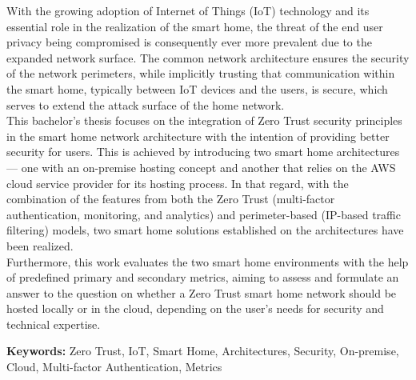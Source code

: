 With the growing adoption of Internet of Things (IoT) technology and its essential role in the realization of the smart home, the threat of the end user privacy being compromised is consequently ever more prevalent due to the expanded network surface. The common network architecture ensures the security of the network perimeters, while implicitly trusting that communication within the smart home, typically between IoT devices and the users, is secure, which serves to extend the attack surface of the home network.\\
This bachelor's thesis focuses on the integration of Zero Trust security principles in the smart home network architecture with the intention of providing better security for users. This is achieved by introducing two smart home architectures — one with an on-premise hosting concept and another that relies on the AWS cloud service provider for its hosting process. In that regard, with the combination of the features from both the Zero Trust (multi-factor authentication, monitoring, and analytics) and perimeter-based (IP-based traffic filtering) models, two smart home solutions established on the architectures have been realized.\\
Furthermore, this work evaluates the two smart home environments with the help of predefined primary and secondary metrics, aiming to assess and formulate an answer to the question on whether a Zero Trust smart home network should be hosted locally or in the cloud, depending on the user's needs for security and technical expertise.

\vspace*{1.0cm}
\textbf{Keywords:} Zero Trust, IoT, Smart Home, Architectures, Security, On-premise, Cloud, Multi-factor Authentication, Metrics